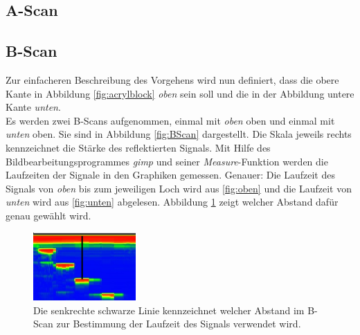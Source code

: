 \subsection{A-Scan\label{sec:AScan}}
\subsection{B-Scan\label{sec:BScan}}
Zur einfacheren Beschreibung des Vorgehens wird nun definiert, dass die obere Kante in Abbildung \ref{fig:acrylblock} \emph{oben} sein soll und die in der Abbildung untere Kante \emph{unten}. \\
Es werden zwei B-Scans aufgenommen, einmal mit \emph{oben} oben und einmal mit \emph{unten} oben. Sie sind in Abbildung \ref{fig:BScan} dargestellt. Die Skala jeweils rechts kennzeichnet die Stärke des reflektierten Signals. Mit Hilfe des Bildbearbeitungsprogrammes \emph{gimp} und seiner \emph{Measure}-Funktion werden die Laufzeiten der Signale in den Graphiken gemessen. Genauer: Die Laufzeit des Signals von \emph{oben} bis zum jeweiligen Loch wird aus \ref{fig:oben} und die Laufzeit von \emph{unten} wird aus \ref{fig:unten} abgelesen. Abbildung \ref{fig:Schema} zeigt welcher Abstand dafür genau gewählt wird.
\begin{figure}[h!]
	\centering
	\includegraphics[width=0.35\textwidth]{Schema.png}
	\caption{Die senkrechte schwarze Linie kennzeichnet welcher Abstand im B-Scan zur Bestimmung der Laufzeit des Signals verwendet wird.}
	\label{fig:Schema}
\end{figure} \\

